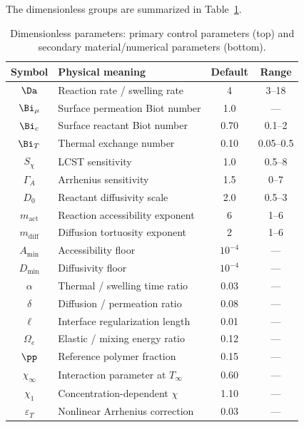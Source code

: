 The dimensionless groups are summarized in Table~\ref{tab:params}.

\begin{table}[h]
\centering
\caption{Dimensionless parameters: primary control parameters (top)
  and secondary material/numerical parameters (bottom).}
\label{tab:params}
\begin{ruledtabular}
\begin{tabular}{clcc}
Symbol & Physical meaning & Default & Range\\
\hline
$\Da$            & Reaction rate / swelling rate   & 4     & 3--18\\
$\Bi_\mu$        & Surface permeation Biot number  & 1.0   & ---\\
$\Bi_c$          & Surface reactant Biot number    & 0.70  & 0.1--2\\
$\Bi_T$          & Thermal exchange number         & 0.10  & 0.05--0.5\\
$S_\chi$         & LCST sensitivity               & 1.0   & 0.5--8\\
$\Gamma_A$       & Arrhenius sensitivity           & 1.5   & 0--7\\
$D_0$            & Reactant diffusivity scale     & 2.0   & 0.5--3\\
$m_\mathrm{act}$ & Reaction accessibility exponent& 6     & 1--6\\
$m_\mathrm{diff}$& Diffusion tortuosity exponent  & 2     & 1--6\\
$A_\mathrm{min}$ & Accessibility floor           & $10^{-4}$ & ---\\
$D_\mathrm{min}$ & Diffusivity floor             & $10^{-4}$ & ---\\
\hline
$\alpha$         & Thermal / swelling time ratio   & 0.03  & ---\\
$\delta$         & Diffusion / permeation ratio    & 0.08  & ---\\
$\ell$           & Interface regularization length & 0.01  & ---\\
$\Omega_e$       & Elastic / mixing energy ratio   & 0.12  & ---\\
$\pp$            & Reference polymer fraction      & 0.15  & ---\\
$\chi_\infty$    & Interaction parameter at $T_\infty$ & 0.60 & ---\\
$\chi_1$         & Concentration-dependent $\chi$  & 1.10  & ---\\
$\varepsilon_T$  & Nonlinear Arrhenius correction  & 0.03  & ---\\
\end{tabular}
\end{ruledtabular}
\end{table}

